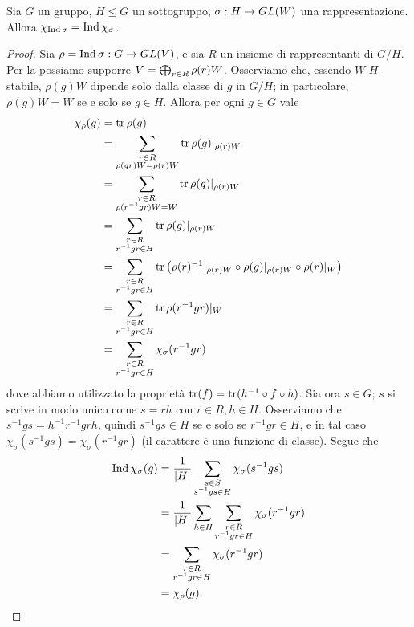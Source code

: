 \begin{proposition}
Sia $G$ un gruppo, $H\le G$ un sottogruppo, $\sigma:H\to GL(W)$ una rappresentazione. Allora $\chi_{\operatorname{Ind}\sigma}=\operatorname{Ind}\chi_\sigma$.
\end{proposition}
\begin{proof}
Sia $\rho=\operatorname{Ind}\sigma:G\to GL(V)$, e sia $R$ un insieme di rappresentanti di $G/H$. Per la  possiamo supporre $V=\bigoplus_{r\in R}\rho(r)W$. Osserviamo che, essendo $W$ $H$-stabile, $\rho(g)W$ dipende solo dalla classe di $g$ in $G/H$; in particolare, $\rho(g)W=W$ se e solo se $g\in H$. Allora per ogni $g\in G$ vale
\begin{align*}
\chi_\rho(g)&=\operatorname{tr}\rho(g)\\
&=\sum_{\substack{r\in R\\\rho(gr)W=\rho(r)W}}\operatorname{tr}\rho(g)|_{\rho(r)W}\\
&=\sum_{\substack{r\in R\\\rho(r^{-1}gr)W=W}}\operatorname{tr}\rho(g)|_{\rho(r)W}\\
&=\sum_{\substack{r\in R\\r^{-1}gr\in H}}\operatorname{tr}\rho(g)|_{\rho(r)W}\\
&=\sum_{\substack{r\in R\\r^{-1}gr\in H}}\operatorname{tr}\left(\rho(r)^{-1}|_{\rho(r)W}\circ\rho(g)|_{\rho(r)W}\circ\rho(r)|_W\right)\\
&=\sum_{\substack{r\in R\\r^{-1}gr\in H}}\operatorname{tr}\rho(r^{-1}gr)|_W\\
&=\sum_{\substack{r\in R\\r^{-1}gr\in H}}\chi_\sigma(r^{-1}gr)
\end{align*}
dove abbiamo utilizzato la proprietà $\operatorname{tr}(f)=\operatorname{tr}(h^{-1}\circ f\circ h)$. Sia ora $s\in G$; $s$ si scrive in modo unico come $s=rh$ con $r\in R\comma h\in H$. Osserviamo che $s^{-1}gs=h^{-1}r^{-1}grh$, quindi $s^{-1}gs\in H$ se e solo se $r^{-1}gr\in H$, e in tal caso $\chi_\sigma(s^{-1}gs)=\chi_\sigma(r^{-1}gr)$ (il carattere è una funzione di classe). Segue che
\begin{align*}
\operatorname{Ind}\chi_\sigma(g)&=\frac{1}{|H|}\sum_{\substack{s\in S\\s^{-1}gs\in H}}\chi_\sigma(s^{-1}gs)\\
&=\frac{1}{|H|}\sum_{h\in H}\sum_{\substack{r\in R\\r^{-1}gr\in H}}\chi_\sigma(r^{-1}gr)\\
&=\sum_{\substack{r\in R\\r^{-1}gr\in H}}\chi_\sigma(r^{-1}gr)\\
&=\chi_\rho(g).
\end{align*}
\end{proof}

